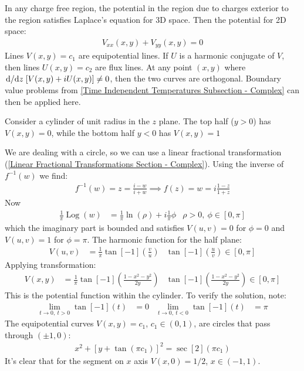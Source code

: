 \documentclass[12pt, english]{book}
\DeclareMathOperator\Log{Log}
\begin{document}
	In any charge free region, the potential in the region due to charges exterior to the region satisfies Laplace's equation for 3D space. Then the potential for 2D space:
	\begin{align*}
		V_{xx}(x,y) + V_{yy}(x,y) = 0
	\end{align*}
	Lines \(V(x,y) = c_1\) are equipotential lines.
	If \(U\) is a harmonic conjugate of \(V\), then lines \(U(x,y) = c_2\) are flux lines. At any point \((x,y)\) where \(\dv*{z} [V(x,y) + iU(x,y)] \neq 0\), then the two curves are orthogonal. Boundary value problems from \cref{Time Independent Temperatures Subsection - Complex} can then be applied here.
	
	\begin{example}
		Consider a cylinder of unit radius in the \(z\) plane. The top half (\(y>0\)) has \(V(x,y) = 0\), while the bottom half \(y<0\) has \(V(x,y) = 1\)
		
		We are dealing with a circle, so we can use a linear fractional transformation (\cref{Linear Fractional Transformations Section - Complex}). Using the inverse of \(f^{-1}(w)\) we find:
		\begin{align*}
			f^{-1}(w) = z = \frac{i - w}{i + w} 
			\implies f(z) = w = i \frac{1 - z}{1 + z}
		\end{align*}
		Now
		\begin{align*}
			\frac{1}{\pi} \Log(w)
			&= \frac{1}{\pi} \ln(\rho) + i \frac{1}{\pi} \phi
				& \rho > 0, \ \phi \in [0, \pi]
		\end{align*}
		which the imaginary part is bounded and satisfies \(V(u,v) = 0\) for \(\phi = 0\) and \(V(u,v) = 1\) for \(\phi = \pi\). The harmonic function for the half plane:
		\begin{align*}
			V(u, v) &= \frac{1}{\pi} \tan[-1](\frac{v}{u})
				& \tan[-1](\frac{u}{v}) \in [0, \pi]
		\end{align*}
		Applying transformation:
		\begin{align*}
			V(x,y) &= \frac{1}{\pi} \tan[-1](\frac{1-x^2-y^2}{2y})
				& \tan[-1](\frac{1-x^2-y^2}{2y}) \in [0, \pi]
		\end{align*}
		This is the potential function within the cylinder. To verify the solution, note:
		\begin{align*}
			\lim_{t\rightarrow0, \ t>0} \tan[-1](t) &= 0 	&
			\lim_{t\rightarrow0, \ t<0} \tan[-1](t) &= \pi 
		\end{align*}
		The equipotential curves \(V(x,y) = c_1\), \(c_1 \in (0, 1)\), are circles that pass through \((\pm 1, 0)\):
		\begin{align*}
			x^2 + [y + \tan(\pi c_1)]^2 = \sec[2](\pi c_1)
		\end{align*}
		It's clear that for the segment on \(x\) axis \(V(x, 0) = 1/2\), \(x \in (-1, 1)\). 
		

\end{example}
\end{document}
